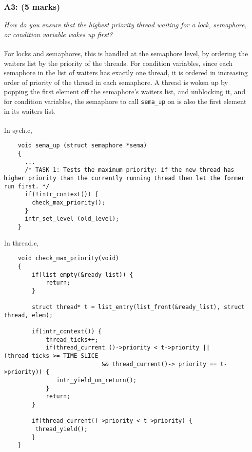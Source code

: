 \documentclass{article}
\begin{document}
\subsubsection*{A3: (5 marks) }
\textit{How do you ensure that the highest priority thread waiting for a lock, semaphore, or condition variable wakes up first?}
\\ \\
For locks and semaphores, this is handled at the semaphore level, by ordering the waiters list by the priority of the threads. For condition variables, since each semaphore in the list of waiters has exactly one thread, it is ordered in increasing order of priority of the thread in each semaphore.
A thread is woken up by popping the first element off the semaphore's waiters list, and unblocking it, and for condition variables, the semaphore to call \texttt{sema\_up} on is also the first element in its waiters list.
\\\\
In sych.c,
\begin{lstlisting}
    void sema_up (struct semaphore *sema)
    {
      ...
      /* TASK 1: Tests the maximum priority: if the new thread has higher priority than the currently running thread then let the former run first. */
      if(!intr_context()) {
        check_max_priority();
      }
      intr_set_level (old_level);
    }
\end{lstlisting}

In thread.c,
\begin{lstlisting}
    void check_max_priority(void)
    {
        if(list_empty(&ready_list)) {
            return;
        }

        struct thread* t = list_entry(list_front(&ready_list), struct thread, elem);

        if(intr_context()) {
            thread_ticks++;
            if(thread_current ()->priority < t->priority || (thread_ticks >= TIME_SLICE
                            && thread_current()-> priority == t->priority)) {
               intr_yield_on_return();
            }
            return;
        }

        if(thread_current()->priority < t->priority) {
         thread_yield();
        }
    }

\end{lstlisting}
\end{document}
